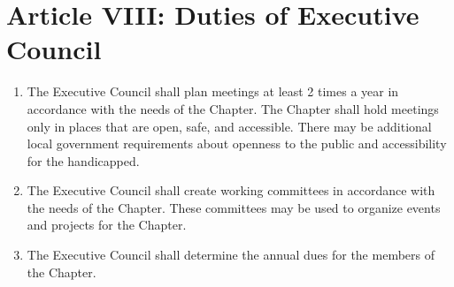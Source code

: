\section*{Article VIII: Duties of Executive Council}

\begin{enumerate}
    \item The Executive Council shall plan meetings at least 2 times a year in accordance with the needs of the Chapter.
    The Chapter shall hold meetings only in places that are open, safe, and accessible.
    There may be additional local government requirements about openness to the public and accessibility for the handicapped.
    \item The Executive Council shall create working committees in accordance with the needs of the Chapter.
    These committees may be used to organize events and projects for the Chapter.
    \item The Executive Council shall determine the annual dues for the members of the Chapter.
\end{enumerate}

